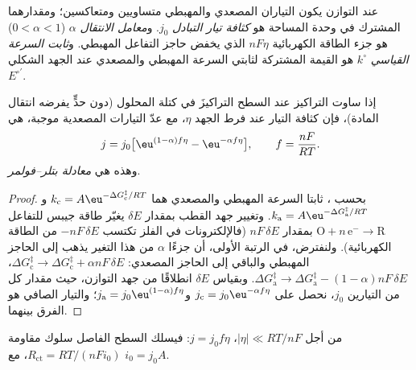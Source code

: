 \begin{definition}\label{def:b3:electrode-kinetics:exchange}
عند التوازن يكون التياران المصعدي والمهبطي متساويين ومتعاكسين؛ 
ومقدارهما المشترك في وحدة المساحة هو \emph{كثافة تيار
التبادل} $j_0$. و\emph{معامل الانتقال}
 $\alpha$ ($0 < \alpha < 1$) هو جزء
الطاقة الكهربائية $nF\eta$ الذي يخفض حاجز التفاعل المهبطي. 
و\emph{ثابت السرعة القياسي} $k^\circ$ هو القيمة
المشتركة لثابتي السرعة المهبطي والمصعدي عند الجهد الشكلي $E^{\circ\prime}$.
\end{definition}

\begin{theorem}\label{thm:b3:electrode-kinetics:butler-volmer}
إذا ساوت التراكيز عند السطح التراكيزَ في كتلة المحلول (دون حدٍّ يفرضه انتقال
المادة)، فإن كثافة التيار عند فرط الجهد $\eta$، مع عدّ التيارات المصعدية
موجبة، هي
\[
  j = j_0\bigl[\eu^{(1 - \alpha)f\eta} - \eu^{-\alpha f\eta}\bigr], \qquad f = \frac{nF}{RT}.
\]
وهذه هي \emph{معادلة بتلر--فولمر}.
\end{theorem}

\begin{proof}
بحسب ، ثابتا السرعة المهبطي والمصعدي هما
$k_{\mathrm c} = A\eu^{-\Delta G_{\mathrm c}^{\ddagger}/RT}$ و$k_{\mathrm a} = A\eu^{-\Delta G_{\mathrm a}^{\ddagger}/RT}$. وتغيير جهد القطب بمقدار $\delta E$
يغيّر طاقة جيبس للتفاعل $\mathrm{O} + n\,\mathrm{e}^- \to \mathrm{R}$ بمقدار $nF\,\delta E$ (فالإلكترونات
في الفلز تكتسب $-nF\,\delta E$ من الطاقة الكهربائية). ولنفترض، في الرتبة الأولى، أن
جزءًا $\alpha$ من هذا التغير يذهب إلى الحاجز المهبطي والباقي إلى
الحاجز المصعدي: $\Delta G_{\mathrm c}^{\ddagger} \to \Delta G_{\mathrm c}^{\ddagger} + \alpha nF\,\delta E$، $\Delta G_{\mathrm a}^{\ddagger} \to \Delta G_{\mathrm a}^{\ddagger} - (1 - \alpha)nF\,\delta E$. وبقياس $\delta E$
انطلاقًا من جهد التوازن، حيث مقدار كل من التيارين $j_0$،
نحصل على $j_{\mathrm c} = j_0\eu^{-\alpha f\eta}$ و$j_{\mathrm a} = j_0\eu^{(1 - \alpha)f\eta}$؛ والتيار الصافي هو
الفرق بينهما.
\end{proof}

\begin{corollary}\label{cor:b3:electrode-kinetics:linear}
من أجل $|\eta| \ll RT/nF$، $j = j_0f\eta$: فيسلك السطح الفاصل سلوك مقاومة
$R_{\mathrm{ct}} = RT/(nFi_0)$، مع $i_0 = j_0A$.
\end{corollary}

